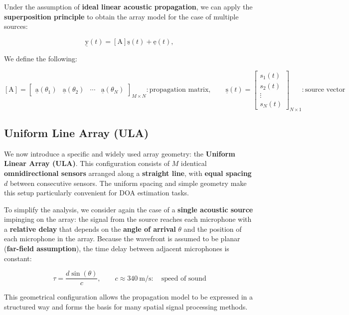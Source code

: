 Under the assumption of \textbf{ideal linear acoustic propagation}, we can apply the \textbf{superposition principle} to obtain the array model for the case of multiple sources:

\[
\underline{\mathrm{y}}(t) = \left[\mathrm{A}\right] \underline{\mathrm{s}}(t) + \underline{\mathrm{e}}(t),
\]

We define the following:

\[
\left[\mathrm{A}\right] = 
\begin{bmatrix}
\underline{\mathrm{a}}(\theta_1) & \underline{\mathrm{a}}(\theta_2) & \cdots & \underline{\mathrm{a}}(\theta_N)
\end{bmatrix}_{M \times N}: \text{propagation matrix},
\qquad
\underline{\mathrm{s}}(t) =
\begin{bmatrix}
s_1(t) \\
s_2(t) \\
\vdots \\
s_N(t)
\end{bmatrix}_{N \times 1}: \text{source vector}
\]

\clearpage

\subsection{Uniform Line Array (ULA)}
We now introduce a specific and widely used array geometry: the \textbf{Uniform Linear Array (ULA)}.
This configuration consists of $M$ identical \textbf{omnidirectional sensors} arranged along a \textbf{straight line}, with \textbf{equal spacing} $d$ between consecutive sensors.
The uniform spacing and simple geometry make this setup particularly convenient for DOA estimation tasks.

To simplify the analysis, we consider again the case of a \textbf{single acoustic source} impinging on the array: the signal from the source reaches each microphone with a \textbf{relative delay} that depends on the \textbf{angle of arrival} $\theta$ and the position of each microphone in the array.
Because the wavefront is assumed to be planar (\textbf{far-field assumption}), the time delay between adjacent microphones is constant:

\[
\tau = \frac{d \sin(\theta)}{c}, \qquad c\approx 340~\text{m/s}: \quad \text{speed of sound}
\]

This geometrical configuration allows the propagation model to be expressed in a structured way and forms the basis for many spatial signal processing methods.

